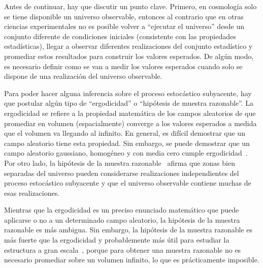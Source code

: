 Antes de continuar, hay que discutir un punto clave. Primero, en cosmología solo se tiene disponible un universo observable, entonces al contrario que en otras ciencias experimentales no es posible volver a ``ejecutar el universo'' desde un conjunto diferente de condiciones iniciales (consistente con las propiedades estadísticas), llegar a observar diferentes realizaciones del conjunto estadístico y promediar estos resultados para construir los valores esperados. De algún modo, es necesario definir como se van a medir los valores esperados cuando solo se dispone de una realización del universo observable.

Para poder hacer alguna inferencia sobre el proceso estocástico subyacente, hay que postular algún tipo de ``ergodicidad'' o ``hipótesis de muestra razonable''. La ergodicidad se refiere a la propiedad matemática de los campos aleatorios de que promediar en volumen (espacialmente) converge a los valores esperados a medida que el volumen va llegando al infinito. En general, es difícil demostrar que un campo aleatorio tiene esta propiedad. Sin embargo, se puede demostrar que un campo aleatorio gaussiano, homogéneo y con media cero cumple ergodicidad~\cite{adler1981}. Por otro lado, la hipótesis de la muestra razonable~\cite{peebles1980large} afirma que zonas bien separadas del universo pueden considerarse realizaciones independientes del proceso estocástico subyacente y que el universo observable contiene muchas de esas realizaciones.

Mientras que la ergodicidad es un preciso enunciado matemático que puede aplicarse o no a un determinado campo aleatorio, la hipótesis de la muestra razonable es más ambigua. Sin embargo, la hipótesis de la muestra razonable es más fuerte que la ergodicidad y probablemente más útil para estudiar la estructura a gran escala~\cite{watts2003statistical}, porque para obtener una muestra razonable no es necesario promediar sobre un volumen infinito, lo que es prácticamente imposible.
